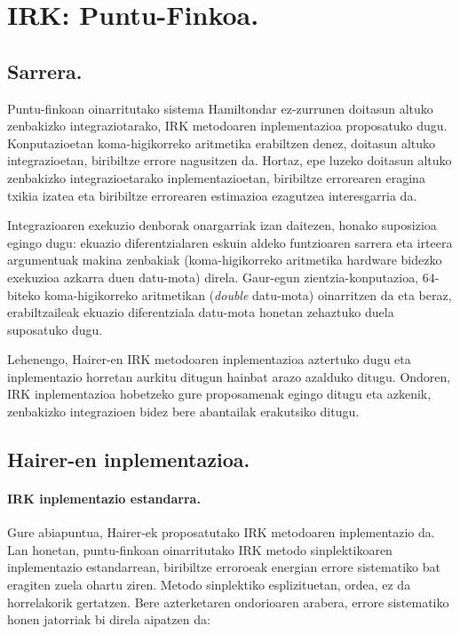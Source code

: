 \chapter{IRK: Puntu-Finkoa.}
\label{chap:IRK-PF}

\section{Sarrera.}


Puntu-finkoan oinarritutako sistema Hamiltondar ez-zurrunen doitasun altuko zenbakizko integraziotarako, IRK metodoaren inplementazioa proposatuko dugu. Konputazioetan koma-higikorreko aritmetika erabiltzen denez, doitasun altuko integrazioetan,  biribiltze errore nagusitzen da. Hortaz, epe luzeko doitasun altuko zenbakizko integrazioetarako inplementazioetan, biribiltze errorearen eragina txikia izatea eta biribiltze errorearen estimazioa ezagutzea interesgarria da. 

Integrazioaren exekuzio denborak onargarriak izan daitezen, honako suposizioa egingo dugu: ekuazio diferentzialaren eskuin aldeko funtzioaren sarrera eta irteera argumentuak makina zenbakiak (koma-higikorreko aritmetika hardware bidezko exekuzioa azkarra duen datu-mota) direla. Gaur-egun zientzia-konputazioa,  $64$-biteko koma-higikorreko aritmetikan (\emph{double} datu-mota) oinarritzen da eta beraz, erabiltzaileak ekuazio diferentziala datu-mota honetan zehaztuko duela suposatuko dugu. 
 
Lehenengo, Hairer-en IRK metodoaren inplementazioa  \cite{Hairer2008} aztertuko dugu eta inplementazio horretan aurkitu ditugun hainbat arazo azalduko ditugu. Ondoren, IRK inplementazioa hobetzeko gure proposamenak egingo ditugu eta azkenik, zenbakizko integrazioen bidez bere abantailak erakutsiko ditugu.

\section{Hairer-en inplementazioa.}

\subsubsection*{IRK inplementazio estandarra.}

Gure abiapuntua, Hairer-ek \cite{Hairer2008} proposatutako IRK metodoaren inplementazio da.  
Lan honetan, puntu-finkoan oinarritutako IRK metodo sinplektikoaren  inplementazio estandarrean, biribiltze erroroeak energian errore sistematiko bat eragiten zuela ohartu ziren. Metodo sinplektiko esplizituetan, ordea, ez da horrelakorik gertatzen. Bere azterketaren ondorioaren arabera, errore sistematiko honen jatorriak bi direla aipatzen da:

